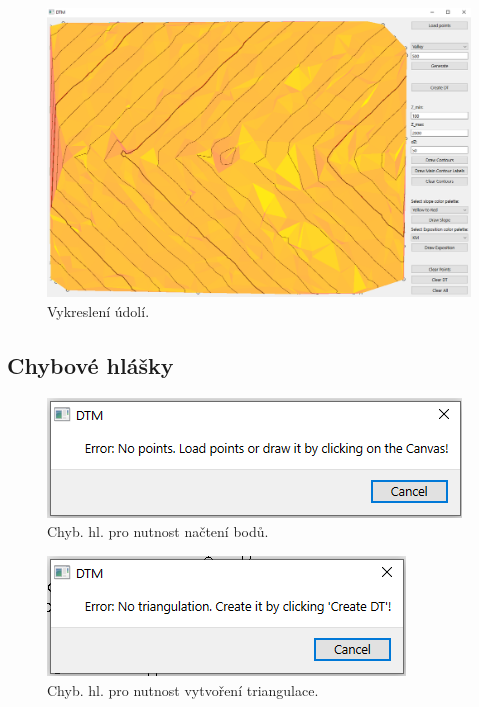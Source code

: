 \documentclass[a4paper, 12pt, oneside, titlepage]{article} %
\begin{document}
\begin{figure}[!htb]
	\centering
	\includegraphics[scale=0.45]{obrazky/udoli.png} 
	\caption{Vykreslení údolí.
	}
	\label{fig:udoli}
\end{figure} 
\FloatBarrier

\subsection{Chybové hlášky}
\begin{figure}[!htb]
	\centering
	\includegraphics[scale=0.7]{obrazky/no_points.png} 
	\caption{Chyb. hl. pro nutnost načtení bodů.
	}
	\label{fig:no_points}
\end{figure} 
\FloatBarrier

\begin{figure}[!htb]
	\centering
	\includegraphics[scale=0.7]{obrazky/no_dt.png} 
	\caption{Chyb. hl. pro nutnost vytvoření triangulace.
	}
	\label{fig:no_dt}
\end{figure} 
\FloatBarrier
\end{document}
